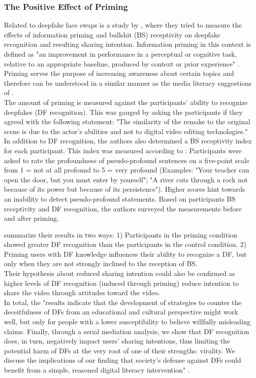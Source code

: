 \documentclass[
  a4paper,  %
  twoside,  %
  bibliography=totoc,
  headsepline,
  cleardoublepage=empty,
  parskip=half,
  draft=false
]{scrbook}
\begin{document}
\subsubsection*{The Positive Effect of Priming}
Related to deepfake face swaps is a study by \citeauthor{iacobucciDeepfakesUnmaskedEffects2021}, where they tried to measure the effects of information priming and bullshit (BS) receptivity on deepfake recognition and resulting sharing intention. Information priming in this context is defined as "an improvement in performance in a perceptual or cognitive task, relative to an appropriate baseline, produced by context or prior experience" \cite{iacobucciDeepfakesUnmaskedEffects2021}. Priming serves the purpose of increasing awareness about certain topics and therefore can be understood in a similar manner as the media literacy suggestions of \citeauthor{hwangEffectsDisinformationUsing2021}. \\
The amount of priming is measured against the participants' ability to recognize deepfakes (DF recognition). This was gauged by asking the participants if they agreed with the following statement: "The similarity of the remake to the original scene is due to the actor's abilities and not to digital video editing technologies." In addition to DF recognition, the authors also determined a BS receptivity index for each participant. This index was measured according to \cite{pennycookReceptionDetectionPseudoprofound2015}: Participants were asked to rate the profoundness of pseudo-profound sentences on a five-point scale from 1 = not at all profound to 5 = very profound (Examples: "Your teacher can open the door, but you must enter by yourself"; "A river cuts through a rock not because of its power but because of its persistence"). Higher scores hint towards an inability to detect pseudo-profound statements. Based on participants BS receptivity and DF recognition, the authors surveyed the measurements before and after priming.

\citeauthor{iacobucciDeepfakesUnmaskedEffects2021} summarize their results in two ways: 1) Participants in the priming condition showed greater DF recognition than the participants in the control condition. 2) Priming users with DF knowledge influences their ability to recognize a DF, but only when they are not strongly inclined to the reception of BS.\\
Their hypothesis about reduced sharing intention could also be confirmed as higher levels of DF recognition (induced through priming) reduce intention to share the video through attitudes toward the video. \\
In total, the "results indicate that the development of strategies to counter the deceitfulness of DFs from an educational and cultural perspective might work well, but only for people with a lower susceptibility to believe willfully misleading claims. Finally, through a serial mediation analysis, we show that DF recognition does, in turn, negatively impact users' sharing intentions, thus limiting the potential harm of DFs at the very root of one of their strengths: virality. We discuss the implications of our finding that society's defense against DFs could benefit from a simple, reasoned digital literacy intervention" \cite{iacobucciDeepfakesUnmaskedEffects2021}.
\end{document}
